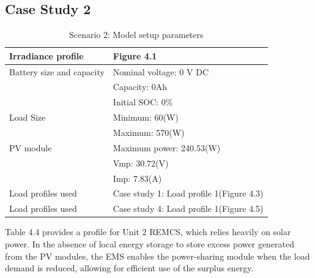 \subsection{Case Study 2}
	\begin{table}[!ht]
	\begin{center}
		\caption{Scenario 2: Model setup parameters}
		\begin{tabular}{|p{6cm}|p{8cm}|} %
			\hline
			\textbf{Irradiance profile } & \textbf{Figure 4.1}\\
			\hline
			Battery size and capacity	& Nominal voltage: 0 V DC \\
			& Capacity: 0Ah\\
			& Initial SOC: 0\% \\
			\hline
			Load Size 					& Minimum: 60(W)\\
			& Maximum: 570(W)\\
			\hline
			PV module		 			& Maximum power: 240.53(W)\\
			& Vmp: 30.72(V)\\
			& Imp: 7.83(A)\\
			\hline
			Load profiles used & Case study 1: Load profile 1(Figure 4.3)\\
			\hline
			Load profiles used & Case study 4: Load profile 1(Figure 4.5)\\
			\hline
		\end{tabular}
	\end{center}
\end{table}
Table 4.4 provides a profile for Unit 2 REMCS, which relies heavily on solar power. In the absence of local energy storage to store excess power generated from the PV modules, the EMS enables the power-sharing module when the load demand is reduced, allowing for efficient use of the surplus energy.

